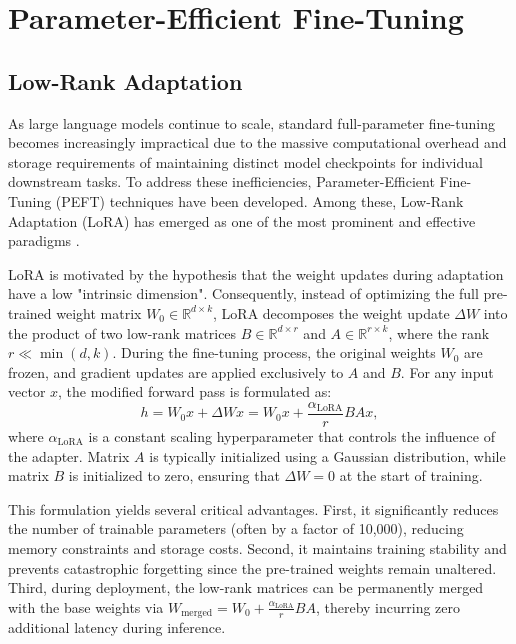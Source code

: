 \section{Parameter-Efficient Fine-Tuning}

\subsection{Low-Rank Adaptation}

As large language models continue to scale, standard full-parameter fine-tuning becomes increasingly impractical due to the massive computational overhead and storage requirements of maintaining distinct model checkpoints for individual downstream tasks. To address these inefficiencies, Parameter-Efficient Fine-Tuning (PEFT) techniques have been developed. Among these, Low-Rank Adaptation (LoRA) has emerged as one of the most prominent and effective paradigms \parencite{hu2021loralowrankadaptationlarge}.

LoRA is motivated by the hypothesis that the weight updates during adaptation have a low "intrinsic dimension". Consequently, instead of optimizing the full pre-trained weight matrix $W_0 \in \mathbb{R}^{d \times k}$, LoRA decomposes the weight update $\Delta W$ into the product of two low-rank matrices $B \in \mathbb{R}^{d \times r}$ and $A \in \mathbb{R}^{r \times k}$, where the rank $r \ll \min(d, k)$. During the fine-tuning process, the original weights $W_0$ are frozen, and gradient updates are applied exclusively to $A$ and $B$. For any input vector $x$, the modified forward pass is formulated as:
\begin{equation}
    h = W_0 x + \Delta W x = W_0 x + \frac{\alpha_{\text{LoRA}}}{r} B A x,
\end{equation} where $\alpha_{\text{LoRA}}$ is a constant scaling hyperparameter that controls the influence of the adapter. Matrix $A$ is typically initialized using a Gaussian distribution, while matrix $B$ is initialized to zero, ensuring that $\Delta W = 0$ at the start of training.

This formulation yields several critical advantages. First, it significantly reduces the number of trainable parameters (often by a factor of 10,000), reducing memory constraints and storage costs. Second, it maintains training stability and prevents catastrophic forgetting since the pre-trained weights remain unaltered. Third, during deployment, the low-rank matrices can be permanently merged with the base weights via $W_{\text{merged}} = W_0 + \frac{\alpha_{\text{LoRA}}}{r} BA$, thereby incurring zero additional latency during inference.

